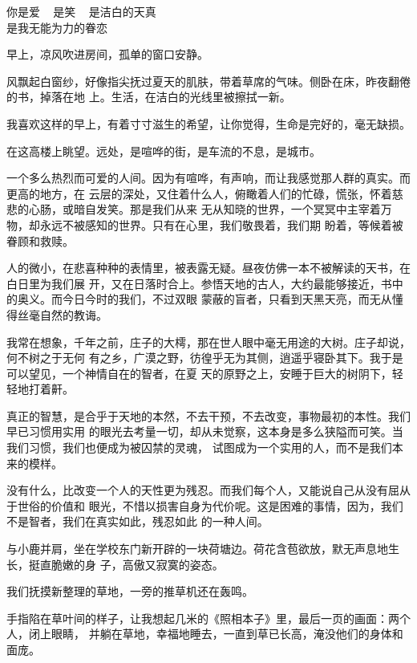 			你是爱 ~ 是笑 ~ 是洁白的天真 \\
			是我无能为力的眷恋
		\endlongpoem

	\endwriting



		早上，凉风吹进房间，孤单的窗口安静。

		风飘起白窗纱，好像指尖抚过夏天的肌肤，带着草席的气味。侧卧在床，昨夜翻倦的书，掉落在地
	上。生活，在洁白的光线里被擦拭一新。

		我喜欢这样的早上，有着寸寸滋生的希望，让你觉得，生命是完好的，毫无缺损。

		在这高楼上眺望。远处，是喧哗的街，是车流的不息，是城市。

		一个多么热烈而可爱的人间。因为有喧哗，有声响，而让我感觉那人群的真实。而更高的地方，在
	云层的深处，又住着什么人，俯瞰着人们的忙碌，慌张，怀着慈悲的心肠，或暗自发笑。那是我们从来
	无从知晓的世界，一个冥冥中主宰着万物，却永远不被感知的世界。只有在心里，我们敬畏着，我们期
	盼着，等候着被眷顾和救赎。

		人的微小，在悲喜种种的表情里，被表露无疑。昼夜仿佛一本不被解读的天书，在白日里为我们展
	开，又在日落时合上。参悟天地的古人，大约最能够接近，书中的奥义。而今日今时的我们，不过双眼
	蒙蔽的盲者，只看到天黑天亮，而无从懂得丝毫自然的教诲。

		我常在想象，千年之前，庄子的大樗，那在世人眼中毫无用途的大树。庄子却说，何不树之于无何
	有之乡，广漠之野，彷徨乎无为其侧，逍遥乎寝卧其下。我于是可以望见，一个神情自在的智者，在夏
	天的原野之上，安睡于巨大的树阴下，轻轻地打着鼾。

		真正的智慧，是合乎于天地的本然，不去干预，不去改变，事物最初的本性。我们早已习惯用实用
	的眼光去考量一切，却从未觉察，这本身是多么狭隘而可笑。当我们习惯，我们也便成为被囚禁的灵魂，
	试图成为一个实用的人，而不是我们本来的模样。

		没有什么，比改变一个人的天性更为残忍。而我们每个人，又能说自己从没有屈从于世俗的价值和
	眼光，不惜以损害自身为代价呢。这是困难的事情，因为，我们不是智者，我们在真实如此，残忍如此
	的一种人间。

		与小鹿并肩，坐在学校东门新开辟的一块荷塘边。荷花含苞欲放，默无声息地生长，挺直脆嫩的身
	子，高傲又寂寞的姿态。

		我们抚摸新整理的草地，一旁的推草机还在轰鸣。

		手指陷在草叶间的样子，让我想起几米的《照相本子》里，最后一页的画面：两个人，闭上眼睛，
	并躺在草地，幸福地睡去，一直到草已长高，淹没他们的身体和面庞。

